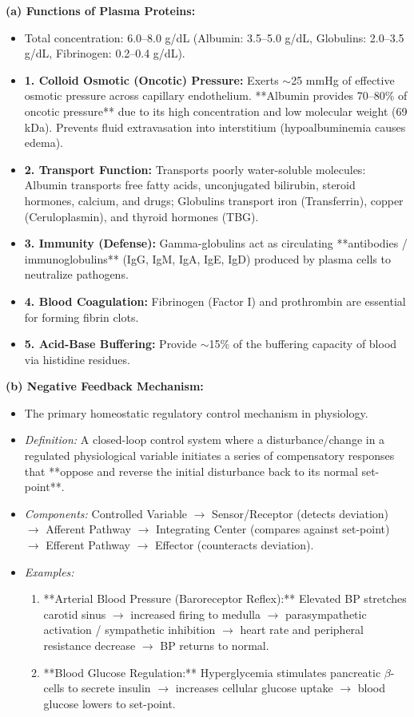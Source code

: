 \documentclass[11pt,a4paper]{article}
\begin{document}
\begin{ansbox}
\textbf{(a) Functions of Plasma Proteins:}
\begin{itemize}[leftmargin=*]
    \item Total concentration: 6.0--8.0 g/dL (Albumin: 3.5--5.0 g/dL, Globulins: 2.0--3.5 g/dL, Fibrinogen: 0.2--0.4 g/dL).
    \item \textbf{1. Colloid Osmotic (Oncotic) Pressure:} Exerts $\sim$25 mmHg of effective osmotic pressure across capillary endothelium. **Albumin provides 70--80\% of oncotic pressure** due to its high concentration and low molecular weight (69 kDa). Prevents fluid extravasation into interstitium (hypoalbuminemia causes edema).
    \item \textbf{2. Transport Function:} Transports poorly water-soluble molecules: Albumin transports free fatty acids, unconjugated bilirubin, steroid hormones, calcium, and drugs; Globulins transport iron (Transferrin), copper (Ceruloplasmin), and thyroid hormones (TBG).
    \item \textbf{3. Immunity (Defense):} Gamma-globulins act as circulating **antibodies / immunoglobulins** (IgG, IgM, IgA, IgE, IgD) produced by plasma cells to neutralize pathogens.
    \item \textbf{4. Blood Coagulation:} Fibrinogen (Factor I) and prothrombin are essential for forming fibrin clots.
    \item \textbf{5. Acid-Base Buffering:} Provide $\sim$15\% of the buffering capacity of blood via histidine residues.
\end{itemize}

\textbf{(b) Negative Feedback Mechanism:}
\begin{itemize}[leftmargin=*]
    \item The primary homeostatic regulatory control mechanism in physiology.
    \item \textit{Definition:} A closed-loop control system where a disturbance/change in a regulated physiological variable initiates a series of compensatory responses that **oppose and reverse the initial disturbance back to its normal set-point**.
    \item \textit{Components:} Controlled Variable $\rightarrow$ Sensor/Receptor (detects deviation) $\rightarrow$ Afferent Pathway $\rightarrow$ Integrating Center (compares against set-point) $\rightarrow$ Efferent Pathway $\rightarrow$ Effector (counteracts deviation).
    \item \textit{Examples:}
    \begin{enumerate}
        \item **Arterial Blood Pressure (Baroreceptor Reflex):** Elevated BP stretches carotid sinus $\rightarrow$ increased firing to medulla $\rightarrow$ parasympathetic activation / sympathetic inhibition $\rightarrow$ heart rate and peripheral resistance decrease $\rightarrow$ BP returns to normal.
        \item **Blood Glucose Regulation:** Hyperglycemia stimulates pancreatic $\beta$-cells to secrete insulin $\rightarrow$ increases cellular glucose uptake $\rightarrow$ blood glucose lowers to set-point.
    \end{enumerate}
\end{itemize}


\end{ansbox}
\end{document}
